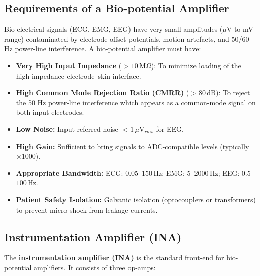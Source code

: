 \documentclass[12pt,a4paper]{article}
\begin{document}
\subsection{Requirements of a Bio-potential Amplifier}

Bio-electrical signals (ECG, EMG, EEG) have very small amplitudes ($\mu$V to mV range) contaminated by electrode offset potentials, motion artefacts, and 50/60 Hz power-line interference. A bio-potential amplifier must have:

\begin{itemize}[leftmargin=*, itemsep=3pt]
  \item \textbf{Very High Input Impedance} ($> 10\,\text{M}\Omega$): To minimize loading of the high-impedance electrode--skin interface.
  \item \textbf{High Common Mode Rejection Ratio (CMRR)} ($> 80\,\text{dB}$): To reject the 50 Hz power-line interference which appears as a common-mode signal on both input electrodes.
  \item \textbf{Low Noise:} Input-referred noise $< 1\,\mu\text{V}_{rms}$ for EEG.
  \item \textbf{High Gain:} Sufficient to bring signals to ADC-compatible levels (typically $\times 1000$).
  \item \textbf{Appropriate Bandwidth:} ECG: $0.05$--$150\,\text{Hz}$; EMG: $5$--$2000\,\text{Hz}$; EEG: $0.5$--$100\,\text{Hz}$.
  \item \textbf{Patient Safety Isolation:} Galvanic isolation (optocouplers or transformers) to prevent micro-shock from leakage currents.
\end{itemize}

\subsection{Instrumentation Amplifier (INA)}

The \textbf{instrumentation amplifier (INA)} is the standard front-end for bio-potential amplifiers. It consists of three op-amps:
\end{document}

